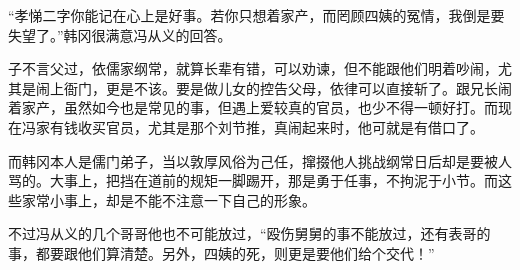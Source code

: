 “孝悌二字你能记在心上是好事。若你只想着家产，而罔顾四姨的冤情，我倒是要失望了。”韩冈很满意冯从义的回答。

子不言父过，依儒家纲常，就算长辈有错，可以劝谏，但不能跟他们明着吵闹，尤其是闹上衙门，更是不该。要是做儿女的控告父母，依律可以直接斩了。跟兄长闹着家产，虽然如今也是常见的事，但遇上爱较真的官员，也少不得一顿好打。而现在冯家有钱收买官员，尤其是那个刘节推，真闹起来时，他可就是有借口了。

而韩冈本人是儒门弟子，当以敦厚风俗为己任，撺掇他人挑战纲常日后却是要被人骂的。大事上，把挡在道前的规矩一脚踢开，那是勇于任事，不拘泥于小节。而这些家常小事上，却是不能不注意一下自己的形象。

不过冯从义的几个哥哥他也不可能放过，“殴伤舅舅的事不能放过，还有表哥的事，都要跟他们算清楚。另外，四姨的死，则更是要他们给个交代！”

